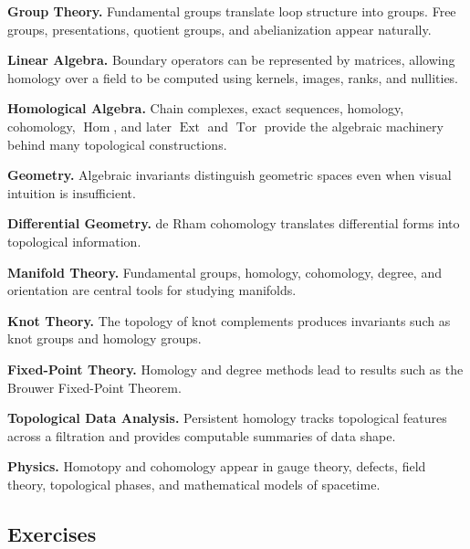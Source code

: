 \begin{applicationbox}
\textbf{Group Theory.}
Fundamental groups translate loop structure into groups. Free groups,
presentations, quotient groups, and abelianization appear naturally.

\medskip

\textbf{Linear Algebra.}
Boundary operators can be represented by matrices, allowing homology over a
field to be computed using kernels, images, ranks, and nullities.

\medskip

\textbf{Homological Algebra.}
Chain complexes, exact sequences, homology, cohomology, \(\operatorname{Hom}\),
and later \(\operatorname{Ext}\) and \(\operatorname{Tor}\) provide the
algebraic machinery behind many topological constructions.

\medskip

\textbf{Geometry.}
Algebraic invariants distinguish geometric spaces even when visual intuition
is insufficient.

\medskip

\textbf{Differential Geometry.}
de Rham cohomology translates differential forms into topological
information.

\medskip

\textbf{Manifold Theory.}
Fundamental groups, homology, cohomology, degree, and orientation are central
tools for studying manifolds.

\medskip

\textbf{Knot Theory.}
The topology of knot complements produces invariants such as knot groups and
homology groups.

\medskip

\textbf{Fixed-Point Theory.}
Homology and degree methods lead to results such as the Brouwer Fixed-Point
Theorem.

\medskip

\textbf{Topological Data Analysis.}
Persistent homology tracks topological features across a filtration and
provides computable summaries of data shape.

\medskip

\textbf{Physics.}
Homotopy and cohomology appear in gauge theory, defects, field theory,
topological phases, and mathematical models of spacetime.
\end{applicationbox}

\subsection{Exercises}
\label{subsec:algebraic-topology-exercises}

